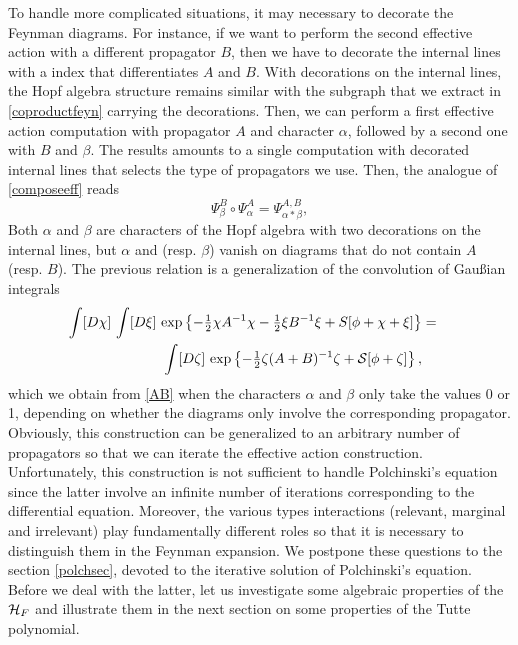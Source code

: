\documentclass[10pt,here,feynmf]{article}
\begin{document}
To handle more complicated situations, it may necessary to decorate the Feynman diagrams. For instance, if we want to perform the second effective action with a different propagator $B$, then we have to decorate the internal lines with a index that differentiates $A$ and $B$. With decorations on the internal lines, the Hopf algebra structure remains similar with the subgraph that we extract in \eqref{coproductfeyn} carrying the decorations. Then, we can perform a first effective action computation with propagator $A$ and character $\alpha$, followed by a second one with $B$ and $\beta$. The results amounts to a single computation with decorated internal lines that selects the type of propagators we use. Then, the analogue of \eqref{composeeff} reads
\begin{equation}
\Psi_{\beta}^{B}\circ\Psi_{\alpha}^{A}=\Psi_{\alpha\ast\beta}^{A,B}\label{AB},
\end{equation}
Both $\alpha$ and $\beta$ are characters of the Hopf algebra with two decorations on the internal lines, but $\alpha$ and (resp. $\beta$) vanish on diagrams that do not contain $A$ (resp. $B$). The previous relation is a generalization of the convolution of Gau\ss ian integrals
\begin{eqnarray}
\int[D\chi]\,\int[D\xi]\,
\exp\left\{-{\textstyle\frac{1}{2}}\chi A^{-1}\chi-{\textstyle \frac{1}{2}}\xi B^{-1}\xi+\-S[\phi+\chi+\xi]\right\}&=&\cr
\int[D\zeta]\,\exp\left\{-{\textstyle\frac{1}{2}}\zeta(A+B)^{-1}\zeta+{\cal
S}[\phi+\zeta]\right\},&&
\end{eqnarray}
which we obtain from \eqref{AB} when the characters $\alpha$ and $\beta$ only take the values 0 or 1, depending on whether the diagrams only involve the corresponding propagator. Obviously, this construction can be generalized to an arbitrary number of propagators so that we can iterate the effective action construction. Unfortunately, this construction is not sufficient to handle Polchinski's equation since the latter involve an infinite number of iterations corresponding to the differential equation. Moreover, the various types interactions (relevant, marginal and irrelevant) play fundamentally different roles so that it is necessary to distinguish them in the Feynman expansion. We postpone these questions to the section \ref{polchsec}, devoted to the iterative solution of Polchinski's equation.  Before we deal with the latter, let us  investigate some algebraic properties of the ${\cal H}_{F}$ and illustrate them in the next section on some properties of the Tutte polynomial.
 
\end{document}
